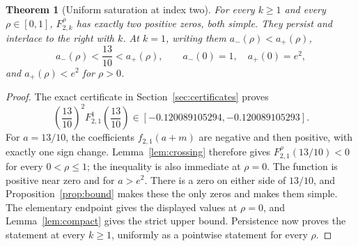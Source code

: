 \documentclass[11pt,letterpaper]{article}
\numberwithin{equation}{section}
\newtheorem{theorem}{Theorem}[section]
\theoremstyle{definition}\newtheorem{definition}[theorem]{Definition}
\theoremstyle{remark}\newtheorem{remark}[theorem]{Remark}
\newcommand{\F}[3]{F_{#1,#2}^{#3}}
\begin{document}
\begin{theorem}[Uniform saturation at index two]\label{thm:n2count}
For every $k\ge1$ and every $\rho\in[0,1]$, $\F 2k\rho$ has exactly two positive zeros, both simple. They persist and interlace to the right with $k$. At $k=1$, writing them $a_-(\rho)<a_+(\rho)$,
\begin{equation}\label{eq:n2bracket}
 a_-(\rho)<\frac{13}{10}<a_+(\rho),\qquad
 a_-(0)=1,\quad a_+(0)=e^2,
\end{equation}
and $a_+(\rho)<e^2$ for $\rho>0$.
\end{theorem}
\begin{proof}
The exact certificate in Section~\ref{sec:certificates} proves
\begin{equation}\label{eq:n2test}
 \left(\frac{13}{10}\right)^2\F21{1}\left(\frac{13}{10}\right)
 \in[-0.120089105294,-0.120089105293].
\end{equation}
For $a=13/10$, the coefficients $f_{2,1}(a+m)$ are negative and then positive, with exactly one sign change. Lemma~\ref{lem:crossing} therefore gives $\F21\rho(13/10)<0$ for every $0<\rho\le1$; the inequality is also immediate at $\rho=0$. The function is positive near zero and for $a>e^2$. There is a zero on either side of $13/10$, and Proposition~\ref{prop:bound} makes these the only zeros and makes them simple. The elementary endpoint gives the displayed values at $\rho=0$, and Lemma~\ref{lem:compact} gives the strict upper bound. Persistence now proves the statement at every $k\ge1$, uniformly as a pointwise statement for every $\rho$.
\end{proof}
\end{document}
